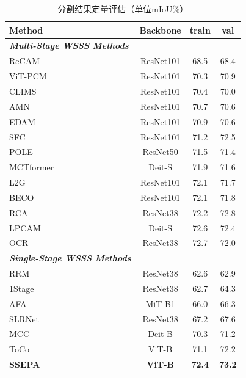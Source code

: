 \begin{table}[htbp]
    
    \normalsize
    \setlength{\tabcolsep}{4mm}
    \centering
    \caption{分割结果定量评估（单位mIoU\%）}\label{table2}
    \tiny
    \begin{tabular}{lccc}
        \toprule
        Method & Backbone & train & val \\
        \midrule
        \textbf{\textit{Multi-Stage WSSS Methods}}& & &\\
        ReCAM\cite{33chen2022class} & ResNet101 & 68.5 & 68.4\\
        ViT-PCM\cite{23rossetti2022max }& ResNet101 & 70.3 & 70.9\\
        CLIMS\cite{08xie2022clims} & ResNet101 & 70.4 & 70.0\\
        AMN\cite{34lee2022threshold} & ResNet101 & 70.7 & 70.6\\
        EDAM\cite{30wu2021embedded} & ResNet101 & 70.9 & 70.6 \\
        SFC\cite{26zhao2024sfc} & ResNet101 & 71.2 & 72.5 \\
        POLE\cite{25murugesan2024prompting} & ResNet50 & 71.5 & 71.4 \\
        MCTformer\cite{12xu2022multi} & Deit-S & 71.9 & 71.6 \\
        L2G\cite{31jiang2022l2g} & ResNet101 & 72.1 & 71.7 \\
        BECO\cite{35rong2023boundary} & ResNet101 & 72.1 & 71.8 \\
        RCA\cite{32zhou2022regional} & ResNet38 & 72.2 & 72.8 \\
        LPCAM\cite{24chen2023extracting} & Deit-S & 72.6 & 72.4 \\
        OCR\cite{36cheng2023out} & ResNet38 & 72.7 & 72.0 \\
        \cmidrule[0.4pt](lr){1-4}
        \textbf{\textit{Single-Stage WSSS Methods}}& & &\\
        RRM\cite{27araslanov2020single} & ResNet38 & 62.6 & 62.9 \\
        1Stage\cite{27araslanov2020single} & ResNet38 & 62.7 & 64.3 \\
        AFA\cite{13ru2022learning} & MiT-B1 & 66.0 & 66.3 \\
        SLRNet\cite{28pan2022learning} & ResNet38 & 67.2 & 67.6 \\
        MCC\cite{29wu2024masked} & Deit-B & 70.3 & 71.2 \\
        ToCo\cite{03ru2023token} & ViT-B & 71.1 & 72.2 \\
        \textbf{SSEPA} & \textbf{ViT-B} & \textbf{72.4} & \textbf{73.2}\\
        \bottomrule
    \end{tabular}
\end{table}

